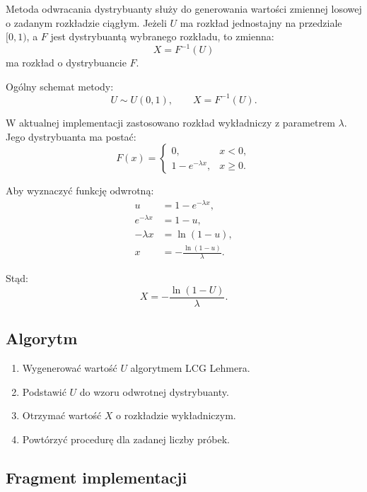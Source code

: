 \documentclass[12pt,a4paper]{article}
\begin{document}
Metoda odwracania dystrybuanty służy do generowania wartości zmiennej losowej o zadanym rozkładzie ciągłym. Jeżeli $U$ ma rozkład jednostajny na przedziale $[0,1)$, a $F$ jest dystrybuantą wybranego rozkładu, to zmienna:
\begin{equation}
  X=F^{-1}(U)
\end{equation}
ma rozkład o dystrybuancie $F$.

Ogólny schemat metody:
\begin{equation}
  U \sim U(0,1),\qquad X=F^{-1}(U).
\end{equation}

W aktualnej implementacji zastosowano rozkład wykładniczy z parametrem $\lambda$. Jego dystrybuanta ma postać:
\begin{equation}
F(x)=
\begin{cases}
0, & x<0,\\
1-e^{-\lambda x}, & x\geq 0.
\end{cases}
\end{equation}

Aby wyznaczyć funkcję odwrotną:
\begin{align}
  u &= 1-e^{-\lambda x},\\
  e^{-\lambda x} &= 1-u,\\
  -\lambda x &= \ln(1-u),\\
  x &= -\frac{\ln(1-u)}{\lambda}.
\end{align}

Stąd:
\begin{equation}
  X=-\frac{\ln(1-U)}{\lambda}.
\end{equation}

\subsection{Algorytm}

\begin{enumerate}
  \item Wygenerować wartość $U$ algorytmem LCG Lehmera.
  \item Podstawić $U$ do wzoru odwrotnej dystrybuanty.
  \item Otrzymać wartość $X$ o rozkładzie wykładniczym.
  \item Powtórzyć procedurę dla zadanej liczby próbek.
\end{enumerate}

\subsection{Fragment implementacji}
\end{document}
